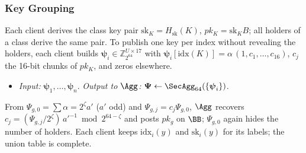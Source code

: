 \subsubsection{Key Grouping}
\label{sec:keys}
Each client derives the class key pair $\mathrm{sk}_K=H_{\mathrm{sk}}(K)$, $pk_K=\mathrm{sk}_K B$;
all holders of a class derive the same pair. To publish one key per index without revealing the
holders, each client builds $\boldsymbol\psi_i\in\mathbb{Z}_{2^{64}}^{U\times17}$ with
$\boldsymbol\psi_i[\mathrm{idx}(K)]=\alpha\,(1,c_1,\dots,c_{16})$, $c_j$ the 16-bit chunks of $pk_K$,
and zeros elsewhere.
\begin{itemize}
  \item \emph{Input:} $\boldsymbol\psi_1,\dots,\boldsymbol\psi_n$. \emph{Output to $\Agg$:}
  $\boldsymbol\Psi\gets\SecAgg_{64}(\{\boldsymbol\psi_i\})$.
\end{itemize}
From $\Psi_{g,0}=\sum\alpha=2^{\zeta}a'$ ($a'$ odd) and $\Psi_{g,j}=c_j\Psi_{g,0}$, $\Agg$ recovers
$c_j=(\Psi_{g,j}/2^{\zeta})\,a'^{-1}\bmod 2^{64-\zeta}$ and posts $pk_g$ on $\BB$; $\Psi_{g,0}$ again
hides the number of holders. Each client keeps $\mathrm{idx}_i(y)$ and $\mathrm{sk}_i(y)$ for its
labels; the union table is complete.

